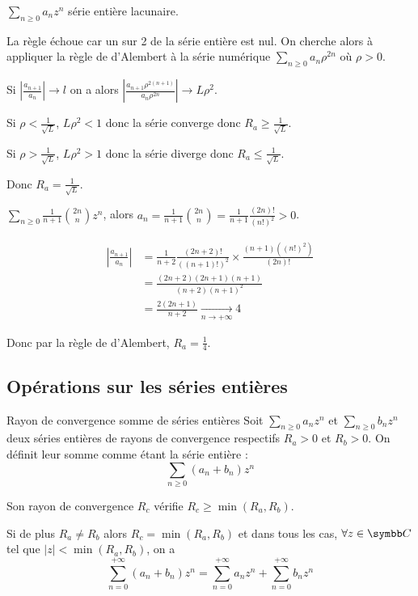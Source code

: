 \begin{exemple}
    $\sum_{n \geqslant 0 } a_n z^n$ série entière lacunaire. 

    La règle échoue car un sur 2 de la série entière est nul. On cherche alors à appliquer la règle 
    de d'Alembert à la série numérique $\sum_{n \geqslant 0} a_n \rho^{2n}$ où $\rho > 0$.

    Si $\left| \frac{a_{n + 1}}{a_n} \right| \to l$ on a alors 
    $\displaystyle \left| \frac{a_{n + 1} \rho^{2(n + 1)}}{a_n \rho^{2n}} \right| \to L \rho^2$. 

    Si $\rho < \frac 1 {\sqrt L}$, $L \rho^2 < 1$ donc la série converge donc $R_a \geqslant \frac 1 {\sqrt L}$.

    Si $\rho > \frac 1 {\sqrt L}$, $L \rho^2 > 1$ donc la série diverge donc $R_a \leqslant \frac 1 {\sqrt L}$.

    Donc $R_a = \frac 1 {\sqrt L}$.
\end{exemple}

\begin{exemple}
    $ \sum_{n \geqslant 0 } \frac 1 {n + 1} \binom{2n }{n } z^n$, alors $a_n = \frac 1 {n + 1} \binom{2n }{ n } = \frac{1 }{n + 1 } \frac{(2n)!}{(n!)^2} > 0$.

    \begin{align*}
        \left| \frac{a_{n + 1 }}{a_n } \right| & = \frac 1 {n + 2} \frac{(2n + 2)!}{ ((n + 1)!)^2} \times \frac{(n + 1)((n!)^2)}{(2n)!} \\
        & = \frac{(2n + 2)(2n + 1)(n + 1)}{(n + 2)(n + 1)^2} \\
        & = \frac{2(2n + 1)}{n + 2} \xrightarrow[n \to + \infty ]{} 4
    \end{align*}

    Donc par la règle de d'Alembert, $R_a = \frac 1 4$.
\end{exemple}

\subsection{Opérations sur les séries entières}

\begin{proposition}{Rayon de convergence somme de séries entières}{}
    Soit $\sum_{n \geqslant 0} a_n z^n$ et $\sum_{n \geqslant 0} b_n z^n$ deux séries entières 
    de rayons de convergence respectifs $R_a > 0$ et $R_b > 0$. On définit leur somme comme étant la série 
    entière :
    \[\sum_{n \geqslant 0} (a_n + b_n) z^n\]

    Son rayon de convergence $R_c$ vérifie $R_c \geqslant \min(R_a, R_b)$.

    Si de plus $R_a \neq R_b$ alors $R_c = \min(R_a, R_b)$ et dans tous les cas, 
    $\forall z \in \C$ tel que $|z| < \min(R_a, R_b)$, on a
    \[\sum_{n = 0}^{+\infty} (a_n + b_n) z^n = \sum_{n = 0}^{+\infty} a_n z^n + \sum_{n = 0}^{+\infty} b_n z^n\]
\end{proposition}

